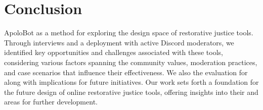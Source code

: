 \section{Conclusion}

 ApoloBot as a method for exploring the design space of restorative justice tools. Through interviews and a deployment with active Discord moderators, we identified key opportunities and challenges associated with these tools, considering various factors spanning the community values, moderation practices, and case scenarios that influence their effectiveness. We also  the evaluation for  along with  implications for future initiatives. Our work sets forth a foundation for the future design of online restorative justice tools, offering insights into their  and areas for further development.

